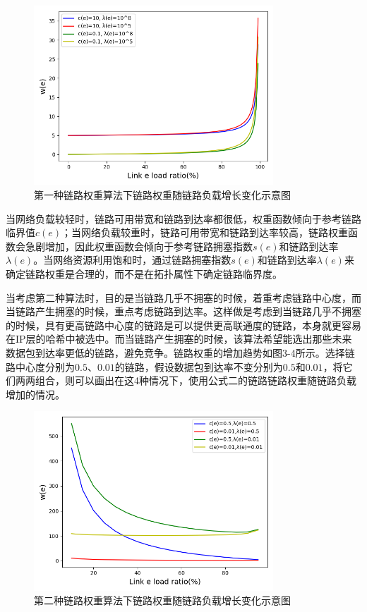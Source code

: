 \begin{figure}[htbp]
\setlength{\abovecaptionskip}{15pt plus 3pt minus 2pt}
\centerline{\includegraphics[width=0.8\textwidth]{./figures/ch3-link-weight-function-1.png}}
\caption{第一种链路权重算法下链路权重随链路负载增长变化示意图}
\label{fig-ch3-link-weight-function-1}
\end{figure}

当网络负载较轻时，链路可用带宽和链路到达率都很低，权重函数倾向于参考链路临界值$c\left(e\right)$；当网络负载较重时，链路可用带宽和链路到达率较高，链路权重函数会急剧增加，因此权重函数会倾向于参考链路拥塞指数$s\left(e\right)$和链路到达率$\lambda\left(e\right)$。当网络资源利用饱和时，通过链路拥塞指数$s\left(e\right)$和链路到达率$\lambda\left(e\right)$来确定链路权重是合理的，而不是在拓扑属性下确定链路临界度。

当考虑第二种算法时，目的是当链路几乎不拥塞的时候，着重考虑链路中心度，而当链路产生拥塞的时候，重点考虑链路到达率。这样做是考虑到当链路几乎不拥塞的时候，具有更高链路中心度的链路是可以提供更高联通度的链路，本身就更容易在IP层的哈希中被选中。而当链路产生拥塞的时候，该算法希望能选出那些未来数据包到达率更低的链路，避免竞争。链路权重的增加趋势如图3-4所示。选择链路中心度分别为$0.5$、$0.01$的链路，假设数据包到达率不变分别为$0.5$和$0.01$，将它们两两组合，则可以画出在这4种情况下，使用公式二的链路链路权重随链路负载增加的情况。

\begin{figure}[htbp]
\setlength{\abovecaptionskip}{15pt plus 3pt minus 2pt}
\centerline{\includegraphics[width=0.8\textwidth]{./figures/ch3-link-weight-function-2.png}}
\caption{第二种链路权重算法下链路权重随链路负载增长变化示意图}
\label{fig-ch3-link-weight-function-2}
\end{figure}


